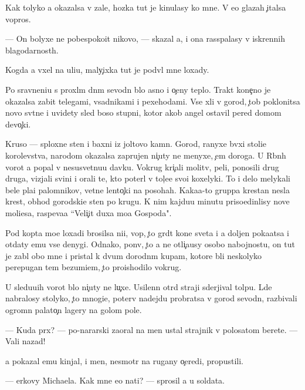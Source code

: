 \documentclass[10pt]{book}
\begin{document}
Kak tolyko {\y}a okazalsa v zale, hoz{\ia}{\y}ka tut je kinulasy ko mne. V {\y}e{\y}o glazah {\c}italsa vopros.

— On bolyxe ne pobespoko{\y}it nikovo, — skazal {\y}a, i ona rass{\yi}palasy v iskrennih blagodarnost{\ia}h.

Kogda {\y}a v{\yi}xel na uli{\q}u, maly{\c}ixka tut je podv{\e}l mne loxady.

Po sravneni{\y}u s proxl{\yi}m dn{\e}m sevodn{\ia} b{\yi}lo {\y}asno i o{\c}eny teplo. Trakt kone{\c}no je okazalsa zabit telegami, vsadnikami i pexehodami. Vse xli v gorod, {\c}tob{\yi} poklonitsa novo{\y} sv{\ia}t{\yi}ne i uvidety sled boso{\y} stupni, kotor{\yi}{\y} {\y}akob{\yi} angel ostavil pered domom devo{\c}ki.

Kruso — sploxn{\yi}{\y}e sten{\yi} i baxni iz joltovo kamn{\ia}. Gorod, ranyxe b{\yi}vxi{\y} stoli{\q}e{\y} korolevstva, narodom okazalsa zaprujen ni{\c}uty ne menyxe, {\c}em doroga. U R{\yi}bn{\yi}h vorot {\y}a popal v nesusvetnu{\y}u davku. Vokrug kri{\c}ali molitv{\yi}, peli, ponosili drug druga, vizjali svin{\yf}i i orali te, kto poter{\ia}l v tol{\c}e{\y}e svo{\y}i koxelyki. To i delo melykali bel{\yi}{\y}e pla{\x}i palomnikov, {\q}vetn{\yi}{\y}e lento{\c}ki na posohah. Kaka{\y}a-to gruppa krest{\y}an nesla krest, obhod{\ia} gorodski{\y}e sten{\yi} po krugu. K nim kajdu{\y}u minutu priso{\y}edin{\ia}lisy nov{\yi}{\y}e mol{\ia}{\x}i{\y}esa, raspeva{\y}a ``Veli{\c}it duxa mo{\y}a Gospoda".

Pod kop{\yi}ta mo{\y}e{\y} loxadi brosilsa ni{\x}i{\y}, vop{\ia}, {\c}to gr{\ia}d{\e}t kone{\q} sveta i {\y}a doljen poka{\y}atsa i otdaty {\y}emu vse denygi. Odnako, pon{\ia}v, {\c}to {\y}a ne otli{\c}a{\y}usy osobo{\y} nabojnost{\y}u, on tut je zab{\yi}l obo mne i pristal k dvum dorodn{\yi}m kup{\q}am, kotor{\yi}{\y}e b{\yi}li neskolyko perepugan{\yi} tem bezumi{\y}em, {\c}to proishodilo vokrug.

U sledu{\y}u{\x}ih vorot b{\yi}lo ni{\c}uty ne lu{\c}xe. Usilenn{\yi}{\y} otr{\ia}d straji sderjival tolpu. L{\iu}de{\y} nabralosy stolyko, {\c}to mnogi{\y}e, poter{\ia}v nadejdu probratsa v gorod sevodn{\ia}, razbivali ogromn{\yi}{\y} palato{\c}n{\yi}{\y} lagery na golom pole.

— Kuda pr{\e}x? — po-nararski zaoral na men{\ia} ustal{\yi}{\y} strajnik v polosatom berete. — Vali nazad!

{\Y}a pokazal {\y}emu kinjal, i men{\ia}, nesmotr{\ia} na rugany o{\c}eredi, propustili.

— {\Q}erkovy Michaela. Kak mne {\y}e{\y}o na{\y}ti? — sprosil {\y}a u soldata.
\end{document}
